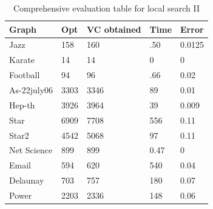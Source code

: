 \begin{table}[htb]
\caption{Comprehensive evaluation table for local search II}
\label{tab2}
\begin{minipage}{\columnwidth}
\begin{center}
\begin{tabular}{@{}lllll@{}}
\toprule
Graph       & Opt  & VC obtained & Time & Error  \\ \midrule
Jazz        & 158  & 160         & .50  & 0.0125 \\
Karate      & 14   & 14          & 0    & 0      \\
Football    & 94   & 96          & .66  & 0.02   \\
As-22july06 & 3303 & 3346        & 89   & 0.01   \\
Hep-th      & 3926 & 3964        & 39   & 0.009  \\
Star        & 6909 & 7708        & 556  & 0.11   \\
Star2       & 4542 & 5068        & 97   & 0.11   \\
Net Science & 899  & 899         & 0.47 & 0      \\
Email       & 594  & 620         & 540  & 0.04   \\
Delaunay    & 703  & 757         & 180  & 0.07   \\
Power       & 2203 & 2336        & 148  & 0.06   \\ \bottomrule
\end{tabular}
\end{center}
\end{minipage}
\end{table}

